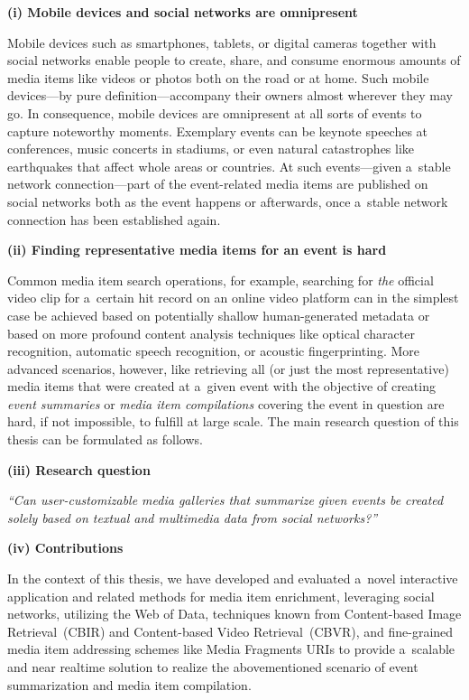\begin{abstracts}

\textbf{(i) Mobile devices and social networks are omnipresent}

Mobile devices such as smartphones, tablets, or digital cameras
together with social networks enable people to create,
share, and consume enormous amounts of media items
like videos or photos both on the road or at home.
Such mobile devices---by pure definition---accompany
their owners almost wherever they may go.
In consequence, mobile devices are omnipresent
at all sorts of events to capture noteworthy moments.
Exemplary events can be keynote speeches at conferences,
music concerts in stadiums,
or even natural catastrophes like earthquakes
that affect whole areas or countries.
At such events---given a~stable network connection---part of
the event-related media items are published on social networks
both as the event happens or afterwards,
once a~stable network connection has been established again.

\textbf{(ii) Finding representative media items
for an event is hard}

Common media item search operations,
for example, searching for \emph{the} official video clip
for a~certain hit record on an online video platform
can in the simplest case be achieved based on potentially
shallow human-generated metadata
or based on more profound content analysis techniques
like optical character recognition,
automatic speech recognition,
or acoustic fingerprinting.
More advanced scenarios, however, like retrieving all
(or just the most representative) media items
that were created at a~given event
with the objective of creating \emph{event summaries} or
\emph{media item compilations} covering the event in question
are hard, if not impossible, to fulfill at large scale.
The main research question of this thesis
can be formulated as follows.

\textbf{(iii) Research question}

\textit{``Can user-customizable media galleries
that summarize given events be\linebreak
created solely based on textual and multimedia data
from social networks?''}

\textbf{(iv) Contributions}

In the context of this thesis, we have developed and evaluated
a~novel interactive application and related methods
for media item enrichment,
leveraging social networks, utilizing the Web of Data,
techniques known from Content-based Image Retrieval~(CBIR)
and Content-based Video Retrieval~(CBVR),
and fine-grained media item addressing schemes
like Media Fragments URIs
to provide a~scalable and near realtime solution
to realize the abovementioned scenario
of event summarization and media item compilation.


\end{abstracts}
